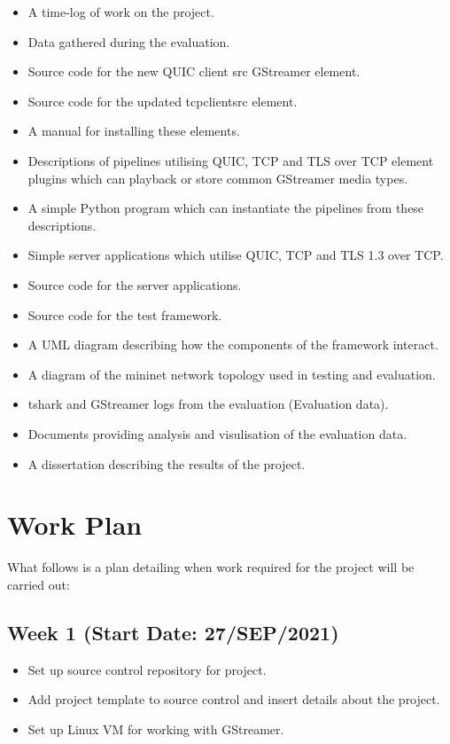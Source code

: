 \documentclass[11pt]{article}
\begin{document}
\begin{itemize}
    \item A time-log of work on the project.
    \item Data gathered during the evaluation.
    \item Source code for the new QUIC client src GStreamer element.
    \item Source code for the updated tcpclientsrc element.
    \item A manual for installing these elements.
    \item Descriptions of pipelines utilising QUIC, TCP and TLS over TCP element plugins which can playback or store common GStreamer media types.
    \item A simple Python program which can instantiate the pipelines from these descriptions.
    \item Simple server applications which utilise QUIC, TCP and TLS 1.3 over TCP.
    \item Source code for the server applications.
    \item Source code for the test framework.
    \item A UML diagram describing how the components of the framework interact.
    \item A diagram of the mininet network topology used in testing and evaluation.
    \item tshark and GStreamer logs from the evaluation (Evaluation data).
    \item Documents providing analysis and visulisation of the evaluation data.
    \item A dissertation describing the results of the project.
\end{itemize}


\section{Work Plan}
What follows is a plan detailing when work required for the project will be carried out:

\subsection{Week 1 (Start Date: 27/SEP/2021)}
\begin{itemize}
    \item Set up source control repository for project.
    \item Add project template to source control and insert details about the project.
    \item Set up Linux VM for working with GStreamer.
\end{itemize}
\end{document}
